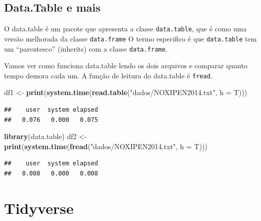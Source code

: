 \documentclass[]{book}
\newenvironment{Shaded}{\begin{snugshade}}{\end{snugshade}}
\newcommand{\KeywordTok}[1]{\textcolor[rgb]{0.13,0.29,0.53}{\textbf{#1}}}
\newcommand{\DataTypeTok}[1]{\textcolor[rgb]{0.13,0.29,0.53}{#1}}
\newcommand{\StringTok}[1]{\textcolor[rgb]{0.31,0.60,0.02}{#1}}
\newcommand{\NormalTok}[1]{#1}
\theoremstyle{definition}
\theoremstyle{definition}
\theoremstyle{definition}
\theoremstyle{remark}
\begin{document}
\subsection{Data.Table e mais}\label{data.table-e-mais}

O data.table é um pacote que apresenta a classe \texttt{data.table}, que
é como uma versão melhorada da classe \texttt{data.frame} O termo
especifico é que \texttt{data.table} tem um ``parentesco'' (inherits)
com a classe \texttt{data.frame}.

Vamos ver como funciona data.table lendo os dois arquivos e comparar
quanto tempo demora cada um. A função de leitura do data.table é
\texttt{fread}.

\begin{Shaded}
\begin{Highlighting}[]
\NormalTok{df1 <-}\StringTok{ }\KeywordTok{print}\NormalTok{(}\KeywordTok{system.time}\NormalTok{(}\KeywordTok{read.table}\NormalTok{(}\StringTok{"dados/NOXIPEN2014.txt"}\NormalTok{, }\DataTypeTok{h =}\NormalTok{ T)))}
\end{Highlighting}
\end{Shaded}

\begin{verbatim}
##    user  system elapsed 
##   0.076   0.000   0.075
\end{verbatim}

\begin{Shaded}
\begin{Highlighting}[]
\KeywordTok{library}\NormalTok{(data.table)}
\NormalTok{df2 <-}\StringTok{ }\KeywordTok{print}\NormalTok{(}\KeywordTok{system.time}\NormalTok{(}\KeywordTok{fread}\NormalTok{(}\StringTok{"dados/NOXIPEN2014.txt"}\NormalTok{, }\DataTypeTok{h =}\NormalTok{ T)))}
\end{Highlighting}
\end{Shaded}

\begin{verbatim}
##    user  system elapsed 
##   0.008   0.000   0.008
\end{verbatim}

\hypertarget{tidyverse}{\section{Tidyverse}\label{tidyverse}}
\end{document}

